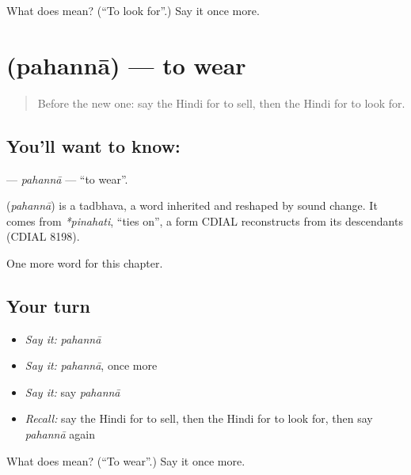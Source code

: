\begin{tcolorbox}[breakable,colback=teal!4,colframe=teal!35!black,title={Before you move on}]
What does  mean? (\textquotedblleft{}To look for\textquotedblright{}.) Say it once more.
\end{tcolorbox}
\section[\texorpdfstring{\hi{पहनना} (pahannā)}{पहनना (pahannā)}]{ (pahannā) — to wear}

\label{lesson:HI-C163-pahanna}



\begin{quote}
Before the new one: say the Hindi for to sell, then the Hindi for to look for.
\end{quote}

\subsection*{You'll want to know: }
\textbf{} — \emph{pahannā} — \textquotedblleft{}to wear\textquotedblright{}.

\begin{cousinweb}
\textbf{} (\emph{pahannā}) is a tadbhava, a word inherited and reshaped by sound change. It comes from \emph{*pinahati}, \textquotedblleft{}ties on\textquotedblright{}, a form CDIAL reconstructs from its descendants (CDIAL 8198).
\end{cousinweb}

\begin{grammarlens}[title={What you've built}]
One more word for this chapter.
\end{grammarlens}

\subsection*{Your turn}
\begin{itemize}
\raggedright
  \item \emph{Say it:} \emph{pahannā}
  \item \emph{Say it:} \emph{pahannā}, once more
  \item \emph{Say it:} say \emph{pahannā}
  \item \emph{Recall:} say the Hindi for to sell, then the Hindi for to look for, then say \emph{pahannā} again
\end{itemize}

\begin{tcolorbox}[breakable,colback=teal!4,colframe=teal!35!black,title={Before you move on}]
What does  mean? (\textquotedblleft{}To wear\textquotedblright{}.) Say it once more.
\end{tcolorbox}
